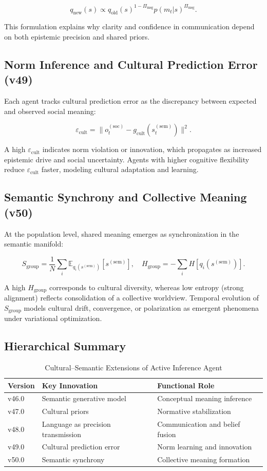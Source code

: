 \documentclass[9pt]{elife}
\begin{document}
\[
q_{\mathrm{new}}(s) \propto
q_{\mathrm{old}}(s)^{1-\Pi_{\mathrm{msg}}}
p(m_t|s)^{\Pi_{\mathrm{msg}}}.
\]

This formulation explains why clarity and confidence in communication
depend on both epistemic precision and shared priors.

\subsection{Norm Inference and Cultural Prediction Error (v49)}

Each agent tracks cultural prediction error as the discrepancy between
expected and observed social meaning:

\[
\varepsilon_{\mathrm{cult}} =
\big\| o^{(\mathrm{soc})}_t - g_{\mathrm{cult}}(s^{(\mathrm{sem})}_t) \big\|^2.
\]

A high $\varepsilon_{\mathrm{cult}}$ indicates norm violation or innovation,
which propagates as increased epistemic drive
and social uncertainty.
Agents with higher cognitive flexibility reduce $\varepsilon_{\mathrm{cult}}$
faster, modeling cultural adaptation and learning.

\subsection{Semantic Synchrony and Collective Meaning (v50)}

At the population level, shared meaning emerges as
synchronization in the semantic manifold:

\[
S_{\mathrm{group}} = \frac{1}{N}
\sum_i \mathbb{E}_{q_i(s^{(\mathrm{sem})})}[s^{(\mathrm{sem})}],
\quad
H_{\mathrm{group}} = -\sum_i H[q_i(s^{(\mathrm{sem})})].
\]

A high $H_{\mathrm{group}}$ corresponds to cultural diversity,
whereas low entropy (strong alignment) reflects consolidation
of a collective worldview.
Temporal evolution of $S_{\mathrm{group}}$
models cultural drift, convergence, or polarization
as emergent phenomena under variational optimization.

\subsection{Hierarchical Summary}

\begin{table}[h]
\centering
\caption{Cultural–Semantic Extensions of Active Inference Agent}
\begin{tabular}{l l l}
\hline
Version & Key Innovation & Functional Role \\
\hline
v46.0 & Semantic generative model & Conceptual meaning inference \\
v47.0 & Cultural priors & Normative stabilization \\
v48.0 & Language as precision transmission & Communication and belief fusion \\
v49.0 & Cultural prediction error & Norm learning and innovation \\
v50.0 & Semantic synchrony & Collective meaning formation \\
\hline
\end{tabular}
\end{table}
\end{document}
